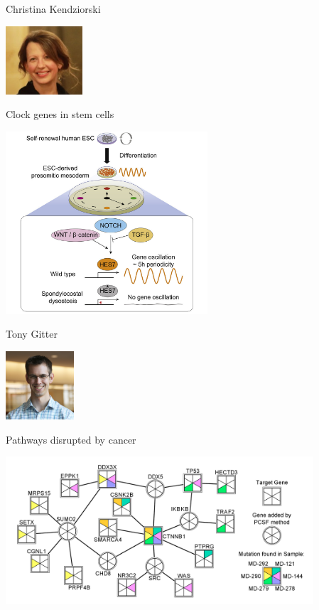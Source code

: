 \documentclass[12pt,t,aspectratio=169]{beamer}
\begin{document}
\begin{frame}{Christina Kendziorski}

\hspace*{0.85\textwidth}
\includegraphics[height=1in]{Pics/kendziorski.jpg}
\vspace*{-30mm}

{\large Clock genes in stem cells}

\bigskip

\includegraphics[height=68mm]{Pics/kendziorski_cellclock.jpg}


\end{frame}



\begin{frame}{Tony Gitter}

\hspace*{0.85\textwidth}
\includegraphics[height=1in]{Pics/tony_gitter.jpg}
\vspace*{-30mm}

{\large Pathways disrupted by cancer}

\bigskip

\includegraphics[height=55mm]{Pics/tony_gitter_MultiPCSF.png}


\end{frame}
\end{document}
